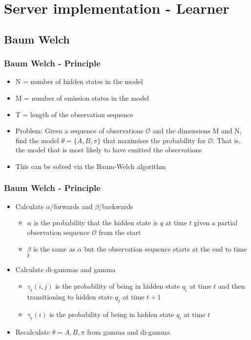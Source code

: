 \section{Server implementation - Learner}
\lstset{language=HMMLanguage,numbers=left,breaklines=true,numbersep=0pt}
\subsection{Baum Welch}
\begin{frame}
	\frametitle{Baum Welch - Principle}
	\begin{itemize}
		\item N = number of hidden states in the model
		\item M = number of emission states in the model
		\item T = length of the observation sequence
		\item Problem: Given a sequence of observations $\mathcal{O}$ and the dimensions M and N, find the model $\theta = \{A, B, \pi\}$ that maximises the probability for $\mathcal{O}$. That is, the model that is most likely to have emitted the observations
		\item This can be solved via the Baum-Welch algorithm
	\end{itemize}
\end{frame}

\begin{frame}
	\frametitle{Baum Welch - Principle}
	\begin{itemize}
		\item Calculate $\alpha$/forwards and $\beta$/backwards
		\begin{itemize}
			\item $\alpha$ is the probability that the hidden state is $q$ at time $t$ given a partial observation sequence $\mathcal{O}$ from the start
			\item $\beta$ is the same as $\alpha$ but the observation sequence starts at the end to time $t$
		\end{itemize}
		\item Calculate di-gammas and gamma
		\begin{itemize}
			\item $\gamma_t(i,j)$ is the probability of being in hidden state $q_i$ at time $t$ and then transitioning to hidden state $q_j$ at time $t+1$
			\item $\gamma_t(i)$ is the probability of being in hidden state $q_i$ at time $t$
		\end{itemize}
		\item Recalculate $\theta = {A,B,\pi}$ from gamma and di-gamma
	\end{itemize}
\end{frame}

